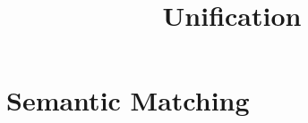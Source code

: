 \documentclass[12pt]{article}
\begin{document}
\title{Unification}

\maketitle
\thispagestyle{empty}
\section{Semantic Matching}
\end{document}
